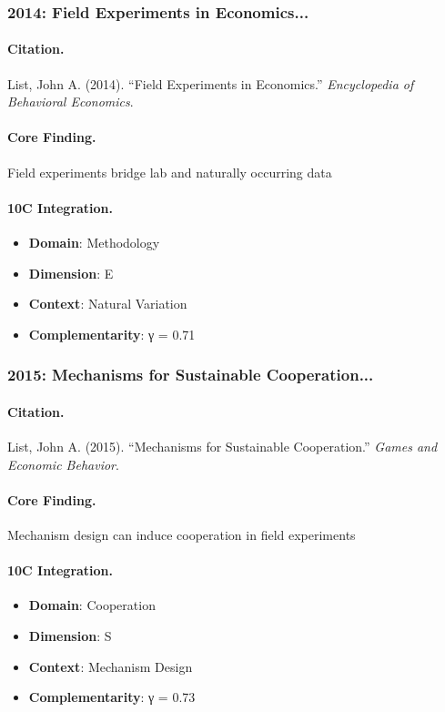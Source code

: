 \subsubsection{2014: Field Experiments in Economics...}

\paragraph{Citation.}
List, John A. (2014). ``Field Experiments in Economics.''
\textit{Encyclopedia of Behavioral Economics}.

\paragraph{Core Finding.}
Field experiments bridge lab and naturally occurring data

\paragraph{10C Integration.}
\begin{itemize}[nosep]
  \item \textbf{Domain}: Methodology
  \item \textbf{Dimension}: E
  \item \textbf{Context}: Natural Variation
  \item \textbf{Complementarity}: γ = 0.71
\end{itemize}


\subsubsection{2015: Mechanisms for Sustainable Cooperation...}

\paragraph{Citation.}
List, John A. (2015). ``Mechanisms for Sustainable Cooperation.''
\textit{Games and Economic Behavior}.

\paragraph{Core Finding.}
Mechanism design can induce cooperation in field experiments

\paragraph{10C Integration.}
\begin{itemize}[nosep]
  \item \textbf{Domain}: Cooperation
  \item \textbf{Dimension}: S
  \item \textbf{Context}: Mechanism Design
  \item \textbf{Complementarity}: γ = 0.73
\end{itemize}


